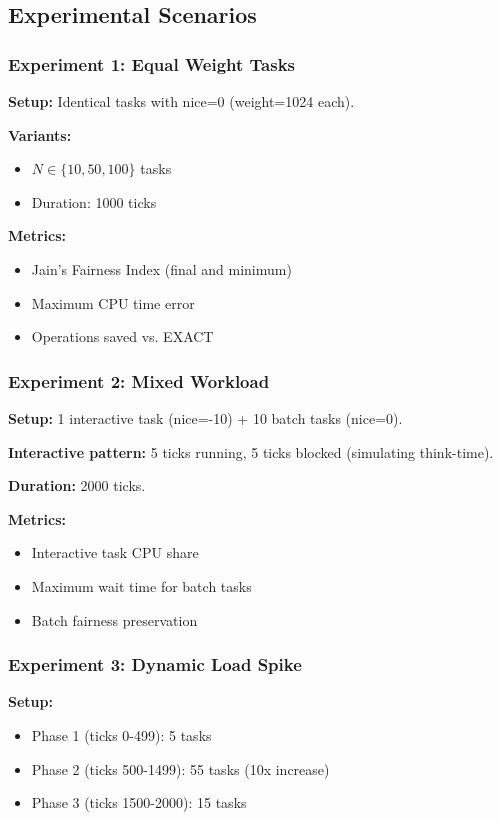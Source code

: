 \documentclass[conference]{IEEEtran}
\begin{document}
\subsection{Experimental Scenarios}

\subsubsection{Experiment 1: Equal Weight Tasks}

\textbf{Setup:} Identical tasks with nice=0 (weight=1024 each).

\textbf{Variants:}
\begin{itemize}
\item $N \in \{10, 50, 100\}$ tasks
\item Duration: 1000 ticks
\end{itemize}

\textbf{Metrics:}
\begin{itemize}
\item Jain's Fairness Index (final and minimum)
\item Maximum CPU time error
\item Operations saved vs. EXACT
\end{itemize}

\subsubsection{Experiment 2: Mixed Workload}

\textbf{Setup:} 1 interactive task (nice=-10) + 10 batch tasks (nice=0).

\textbf{Interactive pattern:} 5 ticks running, 5 ticks blocked (simulating think-time).

\textbf{Duration:} 2000 ticks.

\textbf{Metrics:}
\begin{itemize}
\item Interactive task CPU share
\item Maximum wait time for batch tasks
\item Batch fairness preservation
\end{itemize}

\subsubsection{Experiment 3: Dynamic Load Spike}

\textbf{Setup:} 
\begin{itemize}
\item Phase 1 (ticks 0-499): 5 tasks
\item Phase 2 (ticks 500-1499): 55 tasks (10x increase)
\item Phase 3 (ticks 1500-2000): 15 tasks
\end{itemize}
\end{document}
